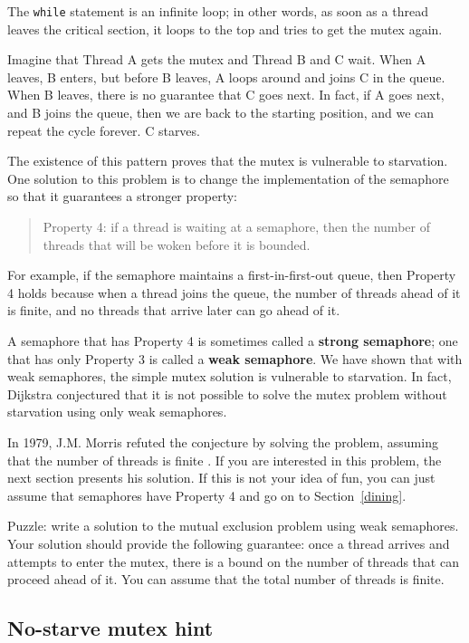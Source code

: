\documentclass{book}
\newcommand{\clearemptydoublepage}{\newpage\cleardoublepage}
\begin{document}
The {\tt while} statement is an infinite loop; in other words,
as soon as a thread leaves the critical section, it loops to the
top and tries to get the mutex again.

Imagine that Thread A gets the mutex and Thread B and C wait.
When A leaves, B enters, but before B leaves, A loops around
and joins C in the queue.  When B leaves, there is no guarantee
that C goes next.  In fact, if A goes next, and B joins the
queue, then we are back to the starting position, and we can
repeat the cycle forever.  C starves.

The existence of this pattern proves that the mutex is
vulnerable to starvation.  One solution to this problem is
to change the implementation of the semaphore so that it
guarantees a stronger property:

\begin{quote}
Property 4: if a thread is waiting at a semaphore, then the
number of threads that will be woken before it is bounded.
\end{quote}

For example, if the semaphore maintains a first-in-first-out
queue, then Property 4 holds because when a thread joins the
queue, the number of threads ahead of it is finite, and
no threads that arrive later can go ahead of it.

A semaphore that has Property 4 is sometimes called a {\bf strong
semaphore}; one that has only Property 3 is called a {\bf weak
semaphore}.  We have shown that with weak semaphores, the simple mutex
solution is vulnerable to starvation.  In fact, Dijkstra conjectured
that it is not possible to solve the mutex problem without starvation
using only weak semaphores.

In 1979, J.M. Morris refuted the conjecture by solving the problem,
assuming that the number of threads is finite \cite{morris}.  If you
are interested in this problem, the next section presents his
solution.  If this is not your idea of fun, you can just assume that
semaphores have Property 4 and go on to Section~\ref{dining}.

Puzzle: write a solution to the mutual exclusion problem using weak
semaphores.  Your solution should provide the following guarantee:
once a thread arrives and attempts to enter the mutex, there is a
bound on the number of threads that can proceed ahead of it.  You can
assume that the total number of threads is finite.


\clearemptydoublepage
\subsection{No-starve mutex hint}
\label{morris}
\end{document}
